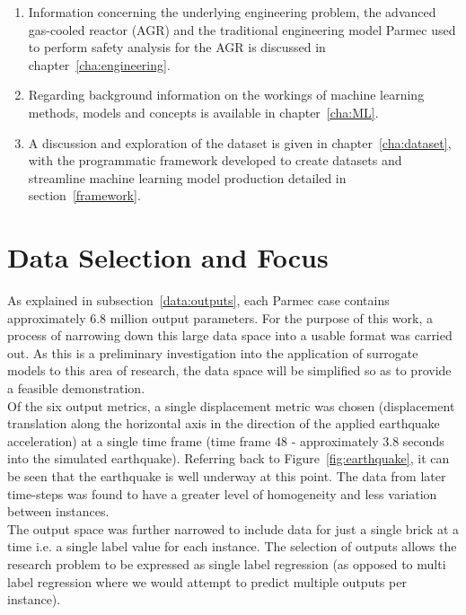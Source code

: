 \begin{enumerate}
	
	\item Information concerning the underlying engineering problem, the advanced gas-cooled reactor (AGR) and the traditional engineering model Parmec used to perform safety analysis for the AGR is discussed in chapter~\ref{cha:engineering}.
	
	\item Regarding background information on the workings of machine learning methods, models and concepts is available in chapter~\ref{cha:ML}.
	
	\item A discussion and exploration of the dataset is given in chapter~\ref{cha:dataset}, with the programmatic framework developed to create datasets and streamline machine learning model production detailed in section~\ref{framework}.
	
	
	
\end{enumerate}

\section{Data Selection and Focus} \label{data_selection}

As explained in subsection~\ref{data:outputs}, each Parmec case contains approximately 6.8 million output parameters. For the purpose of this work, a process of narrowing down this large data space into a usable format was carried out. As this is a preliminary investigation into the application of surrogate models to this area of research, the data space will be simplified so as to provide a feasible demonstration.  
\\

\noindent
Of the six output metrics, a single displacement metric was chosen (displacement translation along the horizontal axis in the direction of the applied earthquake acceleration) at a single time frame (time frame 48 - approximately 3.8 seconds into the simulated earthquake). Referring back to Figure~\ref{fig:earthquake}, it can be seen that the earthquake is well underway at this point. The data from later time-steps was found to have a greater level of homogeneity and less variation between instances.
\\

\noindent
The output space was further narrowed to include data for just a single brick at a time i.e. a single label value for each instance. The selection of outputs allows the research problem to be expressed as single label regression (as opposed to multi label regression where we would attempt to predict multiple outputs per instance).
\\

